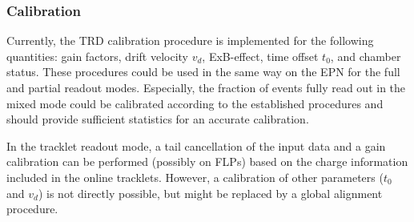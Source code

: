 \subsubsection{Calibration}

Currently, the TRD calibration procedure is implemented for the
following quantities: gain factors, drift velocity $v_{d}$,
ExB-effect, time offset $t_{0}$, and chamber status.  These procedures
could be used in the same way on the EPN for the full and partial
readout modes.  Especially, the fraction of events fully read out in
the mixed mode could be calibrated according to the established
procedures and should provide sufficient statistics for an accurate
calibration.

In the tracklet readout mode, a tail cancellation of the input data
and a gain calibration can be performed (possibly on FLPs) based on
the charge information included in the online tracklets.  However, a
calibration of other parameters ($t_{0}$ and $v_{d}$) is not directly
possible, but might be replaced by a global alignment procedure.


